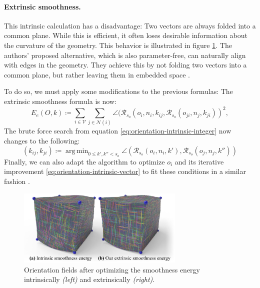 \documentclass{ACGSeminar}
\DeclareMathOperator*{\argmin}{arg\,min}
\begin{document}
\paragraph{Extrinsic smoothness.}
This intrinsic calculation has a disadvantage: Two vectors are always folded into a common plane. While this is efficient, it often loses desirable information about the curvature of the geometry. This behavior is illustrated in figure \ref{fig:orientation-field-illustration}. The authors' proposed alternative, which is also parameter-free, can naturally align with edges in the geometry. They achieve this by not folding two vectors into a common plane, but rather leaving them in embedded space \cite{jakob2015instant}.\bigskip

To do so, we must apply some modifications to the previous formulas:
The extrinsic smoothness formula is now:
\begin{equation}\label{eq:orientation-extrinsic-energy}
	E_e(O,k) \coloneqq \sum_{i \in \mathcal{V}} \sum_{j \in \mathcal{N}(i)} \angle(\mathcal{R}_{s_o}(o_{i}, n_i, k_{ij}, \mathcal{R}_{s_o}(o_{ji}, n_j, k_{ji}))^2,
\end{equation}
The brute force search from equation \eqref{eq:orientation-intrinsic-integer} now changes to the following:
\begin{equation}\label{eq:orientation-extrinsic-integer}
	(k_{ij}, k_{ji}) \coloneqq \argmin_{0 \leq k',k'' < s_o} \angle(\mathcal{R}_{s_o}(o_i, n_i, k'), \mathcal{R}_{s_o}(o_j, n_j, k''))
\end{equation}
Finally, we can also adapt the algorithm to optimize $o_i$ and its iterative improvement \eqref{eq:orientation-intrinsic-vector} to fit these conditions in a similar fashion \cite{jakob2015instant}.

\begin{figure}[htb!]
	\begin{centering}
		\includegraphics[width=8cm]{img/orientation-field-illustration.png}\par
	\end{centering}
	\caption{Orientation fields after optimizing the smoothness energy intrinsically \textit{(left)} and extrinsically \textit{(right)}. \cite{jakob2015instant}}
	\label{fig:orientation-field-illustration}
\end{figure}
\end{document}

